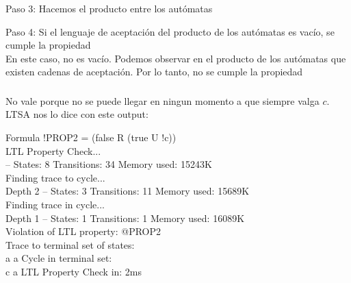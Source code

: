 Paso 3: Hacemos el producto entre los autómatas \\


Paso 4: Si el lenguaje de aceptación del producto de los autómatas es vacío, se cumple la propiedad \\

En este caso, no es vacío. Podemos observar en el producto de los autómatas que existen cadenas de aceptación. Por lo tanto, no se cumple la propiedad \\

\subsubsection{}
No vale porque no se puede llegar en ningun momento a que siempre valga $c$. LTSA nos lo dice con este output:

Formula !PROP2 = (false R (true U !c)) \\
LTL Property Check... \\
-- States: 8 Transitions: 34 Memory used: 15243K \\
Finding trace to cycle... \\
Depth 2 -- States: 3 Transitions: 11 Memory used: 15689K \\
Finding trace in cycle... \\
Depth 1 -- States: 1 Transitions: 1 Memory used: 16089K \\
Violation of LTL property: @PROP2 \\
Trace to terminal set of states: \\
  a
  a
Cycle in terminal set: \\
  c
  a
LTL Property Check in: 2ms \\

